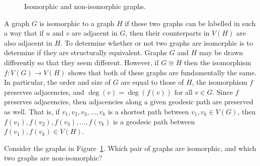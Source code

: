 \begin{figure}[!htbp]
\caption{Isomorphic and non-isomorphic graphs.}
\label{fig:introduction:isomorphic_graphs}
\end{figure}

A graph $G$ is isomorphic to a graph $H$ if these two graphs can be
labelled in such a way that if $u$ and $v$ are adjacent in $G$, then
their counterparts in $V(H)$ are also adjacent in $H$. To determine
whether or not two graphs are isomorphic is to determine if they are
structurally equivalent. Graphs $G$ and $H$ may be drawn differently
so that they seem different. However, if $G \cong H$ then the
isomorphism $f: V(G) \longrightarrow V(H)$ shows that both of these
graphs are fundamentally the same. In particular, the order and size
of $G$ are equal to those of $H$, the isomorphism $f$ preserves
adjacencies, and $\deg(v) = \deg(f(v))$ for all $v \in G$. Since $f$
preserves adjacencies, then adjacencies along a given geodesic path
are preserved as well. That is, if $v_1, v_2, v_3, \dots, v_k$ is a
shortest path between $v_1, v_k \in V(G)$, then
$f(v_1), f(v_2), f(v_3), \dots, f(v_k)$ is a geodesic path between
$f(v_1), f(v_k) \in V(H)$.

\begin{example}
Consider the graphs in
Figure~\ref{fig:introduction:isomorphic_graphs}. Which pair of graphs
are isomorphic, and which two graphs are non-isomorphic?
\end{example}

